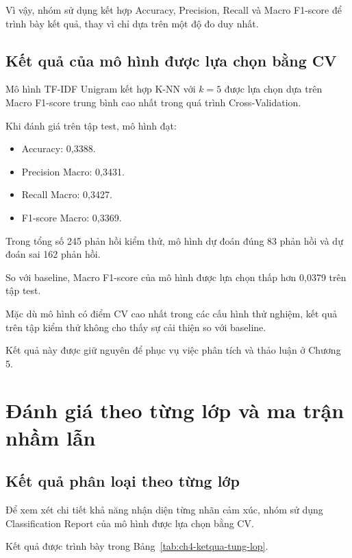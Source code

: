 Vì vậy, nhóm sử dụng kết hợp Accuracy,
Precision, Recall và Macro F1-score để
trình bày kết quả, thay vì chỉ dựa trên
một độ đo duy nhất.


\subsection{Kết quả của mô hình được lựa chọn bằng CV}

Mô hình TF-IDF Unigram kết hợp K-NN với
$k=5$ được lựa chọn dựa trên Macro F1-score
trung bình cao nhất trong quá trình
Cross-Validation.

Khi đánh giá trên tập test, mô hình đạt:

\begin{itemize}
    \item Accuracy: 0,3388.
    \item Precision Macro: 0,3431.
    \item Recall Macro: 0,3427.
    \item F1-score Macro: 0,3369.
\end{itemize}

Trong tổng số 245 phản hồi kiểm thử, mô hình
dự đoán đúng 83 phản hồi và dự đoán sai
162 phản hồi.

So với baseline, Macro F1-score của mô hình
được lựa chọn thấp hơn 0,0379 trên tập test.

Mặc dù mô hình có điểm CV cao nhất trong
các cấu hình thử nghiệm, kết quả trên tập
kiểm thử không cho thấy sự cải thiện so với
baseline.

Kết quả này được giữ nguyên để phục vụ
việc phân tích và thảo luận ở Chương 5.


\section{Đánh giá theo từng lớp và ma trận nhầm lẫn}

\subsection{Kết quả phân loại theo từng lớp}

Để xem xét chi tiết khả năng nhận diện từng
nhãn cảm xúc, nhóm sử dụng Classification
Report của mô hình được lựa chọn bằng CV.

Kết quả được trình bày trong
Bảng~\ref{tab:ch4-ketqua-tung-lop}.

